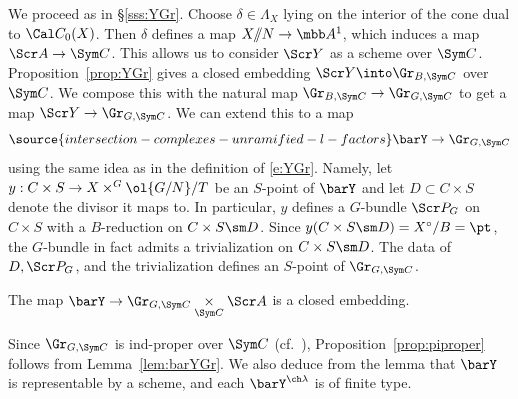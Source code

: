 We proceed as in \S\ref{sss:YGr}.
Choose $\delta\in \Lambda_X$ lying on the interior of the cone
dual to $\Cal C_0(X)$.
Then $\delta$ defines a map $X/\!\!/N \to \mbb A^1$, which induces a map
$\Scr A \to \Sym C$.
This allows us to consider $\Scr Y$ as a scheme over $\Sym C$.
Proposition~\ref{prop:YGr} gives
a closed embedding $\Scr Y \into \Gr_{B,\Sym C}$ over $\Sym C$.
We compose this with the natural map $\Gr_{B,\Sym C} \to \Gr_{G,\Sym C}$
to get a map $\Scr Y \to \Gr_{G,\Sym C}$.
We can extend this to a map
\begin{equation} \label{e:barYGr}
\source{intersection-complexes-unramified-l-factors}
\barY \to \Gr_{G,\Sym C}
\end{equation}
using the same idea as in the definition of \eqref{e:YGr}. Namely,
let $y: C\times S \to X \times^G \ol{G/N} / T$ be an $S$-point of $\barY$
and let $D\subset C\times S$ denote the divisor it maps to.
In particular, $y$ defines a $G$-bundle $\Scr P_G$ on $C\times S$
with a $B$-reduction on $C\times S\sm D$. Since $y(C\times S\sm D) = X^\circ/B =\pt$,
the $G$-bundle in fact admits a trivialization on $C\times S\sm D$.
The data of $D, \Scr P_G$, and the trivialization defines an $S$-point of $\Gr_{G,\Sym C}$.

\begin{lem}
\notready \label{lem:barYGr}
The map $\barY \to \Gr_{G,\Sym C} \underset{\Sym C}\times \Scr A$
is a closed embedding.
\end{lem}

Since $\Gr_{G,\Sym C}$ is ind-proper over $\Sym C$ (cf.~\cite[Remark 3.1.4]{Xinwen}),
Proposition~\ref{prop:piproper} follows from Lemma~\ref{lem:barYGr}.
We also deduce from the lemma that $\barY$ is representable by a scheme, and
each $\barY^{\ch\lambda}$ is of finite type.


